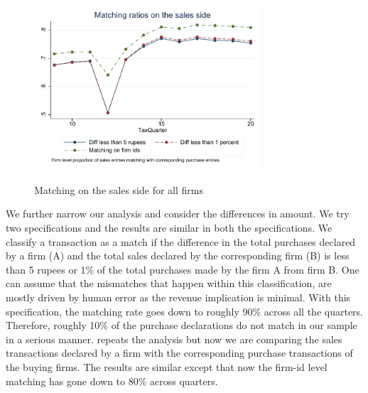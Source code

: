 \begin{figure}[H] 
\centering
\caption{Matching on the sales side for all firms}
\includegraphics[width=0.75\textwidth]{graphs/AvgMatch_Sales_alltypes.pdf}
\label{fig:matching_sales}
\end{figure}


We further narrow our analysis and consider the differences in amount. We try two specifications and the results are similar in both the specifications. We classify a transaction as a match if the difference in the total purchases declared by a firm (A) and the total sales declared by the corresponding firm (B) is less than 5 rupees or 1\% of the total purchases made by the firm A from firm B. One can assume that the mismatches that happen within this classification, are mostly driven by human error as the revenue implication is minimal. With this specification, the matching rate goes down to roughly 90\% across all the quarters. Therefore, roughly 10\% of the purchase declarations do not match in our sample in a serious manner.  repeats the analysis but now we are comparing the sales transactions declared by  a firm with the corresponding purchase transactions of the buying firms. The results are similar except that now the firm-id level matching has gone down to 80\% across quarters. 



